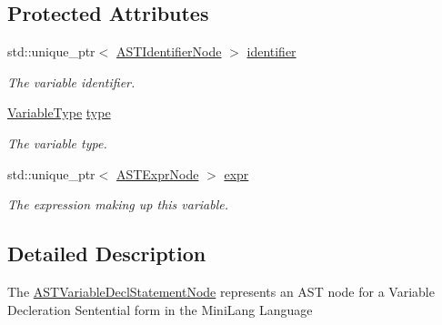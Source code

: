 \subsection*{Protected Attributes}
\begin{DoxyCompactItemize}
\item 
\mbox{\label{classparser_1_1ast_1_1ASTVariableDeclStatementNode_ac835afc9e99d1e9e1af10db2ade9f901}} 
std\+::unique\+\_\+ptr$<$ \hyperlink{classparser_1_1ast_1_1ASTIdentifierNode}{A\+S\+T\+Identifier\+Node} $>$ \hyperlink{classparser_1_1ast_1_1ASTVariableDeclStatementNode_ac835afc9e99d1e9e1af10db2ade9f901}{identifier}
\begin{DoxyCompactList}\small\item\em The variable identifier. \end{DoxyCompactList}\item 
\mbox{\label{classparser_1_1ast_1_1ASTVariableDeclStatementNode_a03d5695c58afabacdbfcf98950a65493}} 
\hyperlink{ASTVariableDeclStatementNode_8h_a1e8e1bde0729627e3a22ffa858d5f3b9}{Variable\+Type} \hyperlink{classparser_1_1ast_1_1ASTVariableDeclStatementNode_a03d5695c58afabacdbfcf98950a65493}{type}
\begin{DoxyCompactList}\small\item\em The variable type. \end{DoxyCompactList}\item 
\mbox{\label{classparser_1_1ast_1_1ASTVariableDeclStatementNode_a5c648465737a76a89f91750b56741557}} 
std\+::unique\+\_\+ptr$<$ \hyperlink{classparser_1_1ast_1_1ASTExprNode}{A\+S\+T\+Expr\+Node} $>$ \hyperlink{classparser_1_1ast_1_1ASTVariableDeclStatementNode_a5c648465737a76a89f91750b56741557}{expr}
\begin{DoxyCompactList}\small\item\em The expression making up this variable. \end{DoxyCompactList}\end{DoxyCompactItemize}


\subsection{Detailed Description}
The \hyperlink{classparser_1_1ast_1_1ASTVariableDeclStatementNode}{A\+S\+T\+Variable\+Decl\+Statement\+Node} represents an A\+ST node for a Variable Decleration Sentential form in the Mini\+Lang Language 

